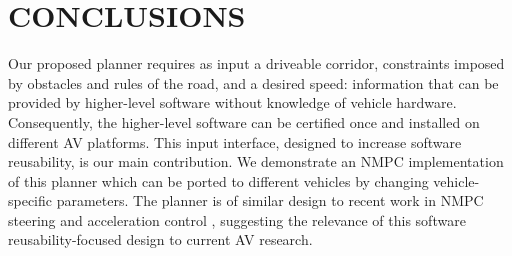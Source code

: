 \documentclass[letterpaper, 10 pt, conference]{ieeeconf}  %
\begin{document}
% 
% 
% 
% 
   
\section{CONCLUSIONS}

Our proposed planner requires as input a driveable corridor, constraints imposed by obstacles and rules of the road, and a desired speed: information that can be provided by higher-level software without knowledge of vehicle hardware. Consequently, the higher-level software can be certified once and installed on different AV platforms. This input interface, designed to increase software reusability, is our main contribution.
We demonstrate an NMPC implementation of this planner which can be ported to different vehicles by changing vehicle-specific parameters. The planner is of similar design to recent work in NMPC steering and acceleration control \cite{nmpc_micheli} \cite{nmpc_platform}, suggesting the relevance of this software reusability-focused design to current AV research.


\addtolength{\textheight}{-12cm}   %
\end{document}
